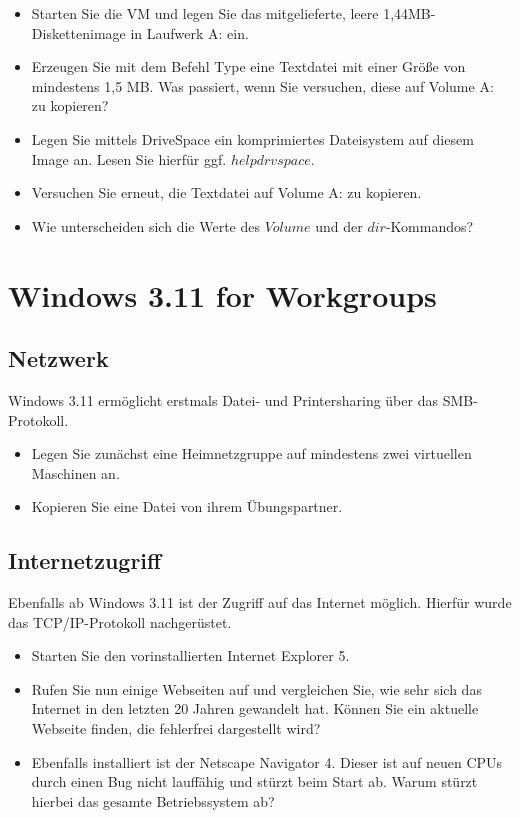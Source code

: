 	\begin{itemize}
		\item Starten Sie die VM und legen Sie das mitgelieferte, leere 1,44MB-Diskettenimage in Laufwerk A: ein.
		\item Erzeugen Sie mit dem Befehl Type eine Textdatei mit einer Größe von mindestens 1,5 MB.
		Was passiert, wenn Sie versuchen, diese auf Volume A: zu kopieren?
		\item Legen Sie mittels DriveSpace ein komprimiertes Dateisystem auf diesem Image an. Lesen Sie hierfür ggf. $help drvspace$.
		\item Versuchen Sie erneut, die Textdatei auf Volume A: zu kopieren. 
		\item Wie unterscheiden sich die Werte des $Volume$ und der $dir$-Kommandos?
	\end{itemize}

\section{Windows 3.11 for Workgroups}

	\subsection{Netzwerk}

		Windows 3.11 ermöglicht erstmals Datei- und Printersharing über das SMB-Protokoll.
	
		\begin{itemize}
			\item Legen Sie zunächst eine Heimnetzgruppe auf mindestens zwei virtuellen Maschinen an.
			\item Kopieren Sie eine Datei von ihrem Übungspartner.
		\end{itemize}

	\subsection{Internetzugriff}

		Ebenfalls ab Windows 3.11 ist der Zugriff auf das Internet möglich.
		Hierfür wurde das TCP/IP-Protokoll nachgerüstet. 

		\begin{itemize}
			\item Starten Sie den vorinstallierten Internet Explorer 5.
			\item Rufen Sie nun einige Webseiten auf und vergleichen Sie, wie sehr sich das Internet in den letzten 20 Jahren gewandelt hat. Können Sie ein aktuelle Webseite finden, die fehlerfrei dargestellt wird?
			\item Ebenfalls installiert ist der Netscape Navigator 4.
		Dieser ist auf neuen CPUs durch einen Bug nicht lauffähig und stürzt beim Start ab. 
		Warum stürzt hierbei das gesamte Betriebssystem ab?
		\end{itemize}

